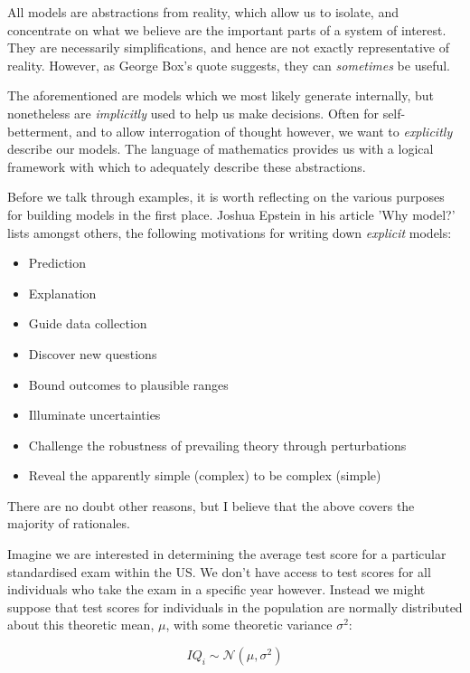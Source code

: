\documentclass[11pt,fullpage]{book}
\begin{document}
All models are abstractions from reality, which allow us to isolate, and concentrate on what we believe are the important parts of a system of interest. They are necessarily simplifications, and hence are not exactly representative of reality. However, as George Box's quote suggests, they can \textit{sometimes} be useful.

The aforementioned are models which we most likely generate internally, but nonetheless are \textit{implicitly} used to help us make decisions. Often for self-betterment, and to allow interrogation of thought however, we want to \textit{explicitly} describe our models. The language of mathematics provides us with a logical framework with which to adequately describe these abstractions.

Before we talk through examples, it is worth reflecting on the various purposes for building models in the first place. Joshua Epstein in his article 'Why model?' lists amongst others, the following motivations for writing down \textit{explicit} models:

\begin{itemize}
\item Prediction
\item Explanation
\item Guide data collection
\item Discover new questions
\item Bound outcomes to plausible ranges
\item Illuminate uncertainties
\item Challenge the robustness of prevailing theory through perturbations
\item Reveal the apparently simple (complex) to be complex (simple) 
\end{itemize}

There are no doubt other reasons, but I believe that the above covers the majority of rationales.

Imagine we are interested in determining the average test score for a particular standardised exam within the US. We don't have access to test scores for all individuals who take the exam in a specific year however. Instead we might suppose that test scores for individuals in the population are normally distributed about this theoretic mean, $\mu$, with some theoretic variance $\sigma^2$:

\begin{equation}\label{eq:Estimators_normalModelExample}
IQ_i \sim \mathcal{N}\left(\mu,\sigma^2\right)
\end{equation}
\end{document}
